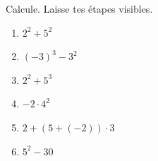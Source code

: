 %
%
    Calcule. Laisse tes étapes visibles.
    \begin{enumerate}[cols=2]
        \item $2^2+5^2$
        \item $(-3)^3-3^2$
        \item $2^2+5^3$
        \item $-2\cdot 4^2$
        \item $2 + \left(5+\left(-2\right)\right) \cdot 3$
        \item $5^2 - 30$
    \end{enumerate}

